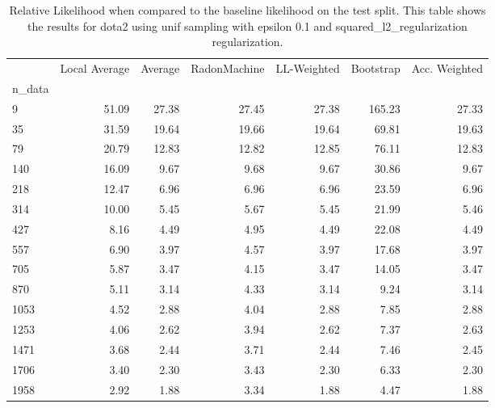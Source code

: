 \begin{table}
\centering
\caption{Relative Likelihood when compared to the baseline likelihood on the test split. This table shows the results for  dota2 using  unif sampling with epsilon  0.1 and  squared_l2_regularization regularization.}
\label{tab:6}
\begin{tabular}{lrrrrrr}
\toprule
{} &  Local Average &  Average &  RadonMachine &  LL-Weighted &  Bootstrap &  Acc. Weighted \\
n\_data &                &          &               &              &            &                \\
\midrule
9      &          51.09 &    27.38 &         27.45 &        27.38 &     165.23 &          27.33 \\
35     &          31.59 &    19.64 &         19.66 &        19.64 &      69.81 &          19.63 \\
79     &          20.79 &    12.83 &         12.82 &        12.85 &      76.11 &          12.83 \\
140    &          16.09 &     9.67 &          9.68 &         9.67 &      30.86 &           9.67 \\
218    &          12.47 &     6.96 &          6.96 &         6.96 &      23.59 &           6.96 \\
314    &          10.00 &     5.45 &          5.67 &         5.45 &      21.99 &           5.46 \\
427    &           8.16 &     4.49 &          4.95 &         4.49 &      22.08 &           4.49 \\
557    &           6.90 &     3.97 &          4.57 &         3.97 &      17.68 &           3.97 \\
705    &           5.87 &     3.47 &          4.15 &         3.47 &      14.05 &           3.47 \\
870    &           5.11 &     3.14 &          4.33 &         3.14 &       9.24 &           3.14 \\
1053   &           4.52 &     2.88 &          4.04 &         2.88 &       7.85 &           2.88 \\
1253   &           4.06 &     2.62 &          3.94 &         2.62 &       7.37 &           2.63 \\
1471   &           3.68 &     2.44 &          3.71 &         2.44 &       7.46 &           2.45 \\
1706   &           3.40 &     2.30 &          3.43 &         2.30 &       6.33 &           2.30 \\
1958   &           2.92 &     1.88 &          3.34 &         1.88 &       4.47 &           1.88 \\
\bottomrule
\end{tabular}
\end{table}
